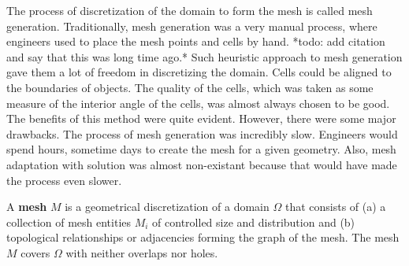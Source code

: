 The process of discretization of the domain to form the mesh is called mesh generation. Traditionally, mesh generation was a very manual process, where engineers used to place the mesh points and cells by hand. *todo: add citation and say that this was long time ago.* Such heuristic approach to mesh generation gave them a lot of freedom in discretizing the domain. Cells could be aligned to the boundaries of objects. The quality of the cells, which was taken as some measure of the interior angle of the cells, was almost always chosen to be good. The benefits of this method were quite evident. However, there were some major drawbacks. The process of mesh generation was incredibly slow. Engineers would spend hours, sometime days to create the mesh for a given geometry. Also, mesh adaptation with solution was almost non-existant because that would have made the process even slower.

\begin{definition}
A \textbf{mesh} $M$ is a geometrical discretization of a domain $\Omega$ that consists of (a) a collection of mesh entities $M_i$ of controlled size and distribution and (b) topological relationships or adjacencies forming the graph of the mesh. The mesh $M$ covers $\Omega$ with neither overlaps nor holes.
\end{definition}

